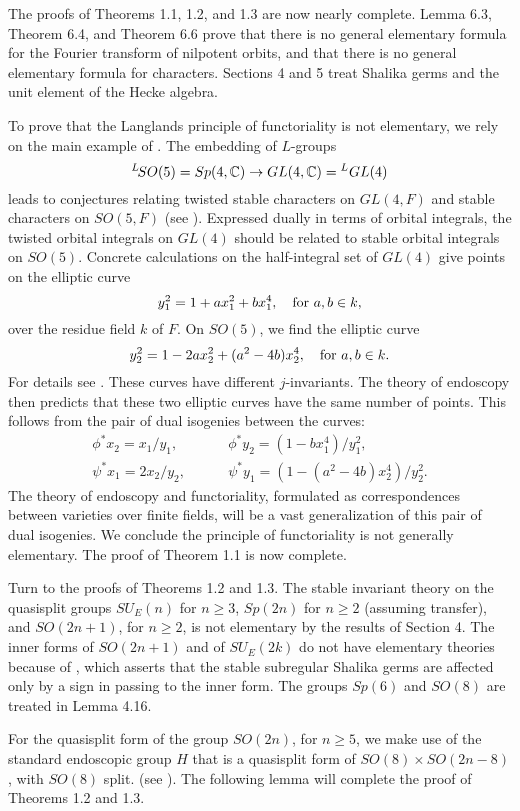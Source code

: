 \documentclass{amsart}
\begin{document}
The proofs of Theorems 1.1, 1.2, and 1.3 are now nearly complete.  Lemma 6.3,
Theorem 6.4, and Theorem 6.6 prove that there is no general elementary
formula for the Fourier transform of nilpotent orbits, and that there
is no general elementary formula for characters.  Sections 4 and 5
treat Shalika germs and the unit element of the Hecke algebra.

To prove that the
Langlands principle of functoriality is not elementary,
we rely on the main example of \cite{H5}.  The embedding of $L$-groups
$${}^L\!SO(5) = Sp(4,{\Bbb C})\to GL(4,{\Bbb C}) = {}^LGL(4)$$ 
leads to conjectures relating twisted stable
characters on $GL(4,F)$ 
and stable characters on $SO(5,F)$ (see \cite{KS1}).
Expressed dually in terms of orbital integrals, the twisted orbital
integrals on $GL(4)$ should be related to stable orbital integrals
on $SO(5)$.  Concrete calculations on the half-integral set of $GL(4)$
give points on the elliptic curve
$$ y_1^2 = 1+ a x_1^2 + b x_1^4, \ \ \hbox{ for } a,b\in k,$$
over the residue field $k$ of $F$.  On $SO(5)$, we find the elliptic
curve
$$ y_2^2 = 1 - 2 a x_2^2 + (a^2 - 4 b) x_2^4, \ \ \hbox{ for } a,b\in k.$$
For details see \cite{H5,2.8}.
These curves have different $j$-invariants.  The theory of endoscopy
then predicts that these two elliptic curves have the same number
of points.  This follows from the pair of dual isogenies between
the curves:
\begin{align*}
\phi^*x_2 = x_1/y_1,\ \qquad&\phi^*y_2 = (1-b x_1^4)/y_1^2,\\
\psi^*x_1 = 2x_2/y_2,\ \qquad&\psi^* y_1 = (1-(a^2-4b) x_2^4)/y_2^2.
\end{align*}
The theory of endoscopy and functoriality, formulated
as correspondences between varieties over finite fields,
will be
a vast generalization of this pair of dual isogenies.  We conclude
the principle of functoriality is not generally elementary.
The proof of Theorem 1.1 is now complete.

Turn to the proofs of
Theorems 1.2 and 1.3.  The stable invariant theory on the quasisplit groups
$SU_E(n)$ for $n\ge 3$, $Sp(2n)$ for $n\ge 2$ (assuming transfer), 
and $SO(2n+1)$, for $n\ge 2$,  is not
elementary by the results of Section 4.  
The inner forms of $SO(2n+1)$
and of $SU_E(2k)$ do not have elementary theories because of 
\cite{H3,VII.4.1}, 
which asserts that the stable
subregular Shalika germs are affected
only by a sign in passing to the inner form.  The groups
 $Sp(6)$ and $SO(8)$ are treated in Lemma 4.16.

For the quasisplit form of the group $SO(2n)$, 
for $n\ge 5$, we make use of the 
standard endoscopic group $H$ that is a quasisplit
form of $SO(8)\times SO(2n-8)$, with $SO(8)$ split.
(see \cite{H5,VII.1.4}).
  The following
lemma will complete the proof of Theorems 1.2 and 1.3.
\end{document}
